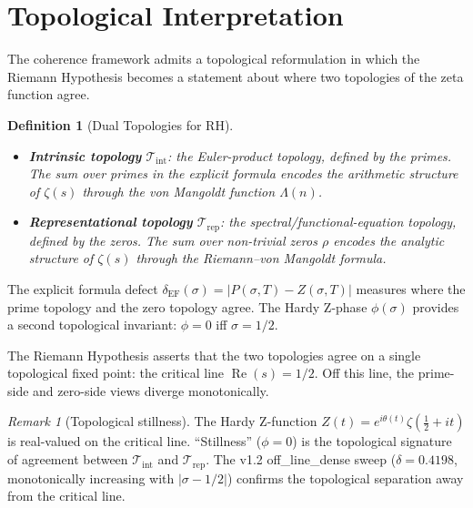 \documentclass[11pt]{article}
\newtheorem{definition}[theorem]{Definition}
\theoremstyle{remark}
\newtheorem{remark}[theorem]{Remark}
\begin{document}
\section{Topological Interpretation}
\label{sec:topology}

The coherence framework admits a topological reformulation in which the
Riemann Hypothesis becomes a statement about where two topologies of the
zeta function agree.

\begin{definition}[Dual Topologies for RH]
\label{def:rh-topo}
\mbox{}
\begin{itemize}
\item \textbf{Intrinsic topology} $\mathcal{T}_{\mathrm{int}}$:
the Euler-product topology, defined by the primes.  The sum over
primes in the explicit formula encodes the arithmetic structure
of $\zeta(s)$ through the von Mangoldt function $\Lambda(n)$.
\item \textbf{Representational topology} $\mathcal{T}_{\mathrm{rep}}$:
the spectral/functional-equation topology, defined by the zeros.
The sum over non-trivial zeros $\rho$ encodes the analytic
structure of $\zeta(s)$ through the Riemann--von Mangoldt formula.
\end{itemize}
\end{definition}

\noindent
The explicit formula defect $\delta_{\mathrm{EF}}(\sigma) =
|P(\sigma,T) - Z(\sigma,T)|$ measures where the prime topology and
the zero topology agree.  The Hardy Z-phase $\phi(\sigma)$ provides
a second topological invariant: $\phi = 0$ iff $\sigma = 1/2$.

The Riemann Hypothesis asserts that the two topologies agree on a
single topological fixed point: the critical line $\operatorname{Re}(s)
= 1/2$.  Off this line, the prime-side and zero-side views diverge
monotonically.

\begin{remark}[Topological stillness]
The Hardy Z-function $Z(t) = e^{i\theta(t)}\zeta(\tfrac{1}{2}+it)$
is real-valued on the critical line.  ``Stillness'' ($\phi = 0$) is
the topological signature of agreement between
$\mathcal{T}_{\mathrm{int}}$ and $\mathcal{T}_{\mathrm{rep}}$.
The v1.2 off\_line\_dense sweep ($\delta = 0.4198$, monotonically
increasing with $|\sigma - 1/2|$) confirms the topological separation
away from the critical line.
\end{remark}
\end{document}
